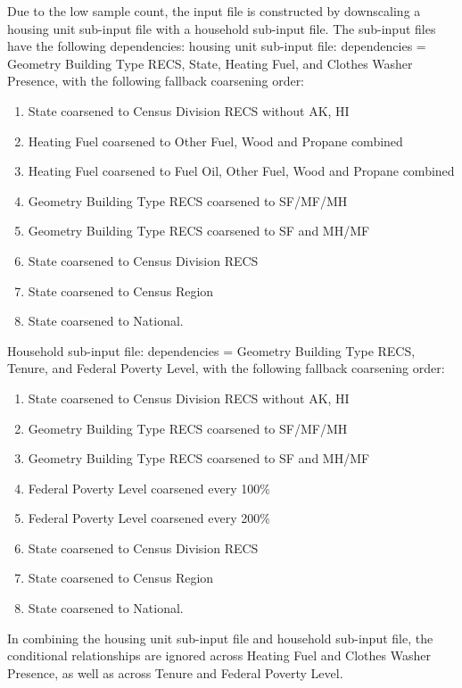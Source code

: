 Due to the low sample count, the input file is constructed by downscaling a housing unit sub-input file with a household sub-input file. The sub-input files have the following dependencies: 
housing unit sub-input file: dependencies = Geometry Building Type RECS, State, Heating Fuel, and Clothes Washer Presence, with the following fallback coarsening order:
\begin{enumerate}
    \item State coarsened to Census Division RECS without AK, HI 
    \item  Heating Fuel coarsened to Other Fuel, Wood and Propane combined 
    \item Heating Fuel coarsened to Fuel Oil, Other Fuel, Wood and Propane combined 
    \item Geometry Building Type RECS coarsened to SF/MF/MH
    \item  Geometry Building Type RECS coarsened to SF and MH/MF 
    \item  State coarsened to Census Division RECS 
    \item State coarsened to Census Region 
    \item State coarsened to National. 
\end{enumerate}

Household sub-input file: dependencies = Geometry Building Type RECS, Tenure, and Federal Poverty Level, with the following fallback coarsening order:
\begin{enumerate}
\item  State coarsened to Census Division RECS without AK, HI 
\item  Geometry Building Type RECS coarsened to SF/MF/MH 
\item  Geometry Building Type RECS coarsened to SF and MH/MF 
\item  Federal Poverty Level coarsened every 100\% 
\item Federal Poverty Level coarsened every 200\%
\item  State coarsened to Census Division RECS
\item State coarsened to Census Region
\item State coarsened to National.
\end{enumerate}

In combining the housing unit sub-input file and household sub-input file, the conditional relationships are ignored across Heating Fuel and Clothes Washer Presence, as well as across Tenure and Federal Poverty Level.
